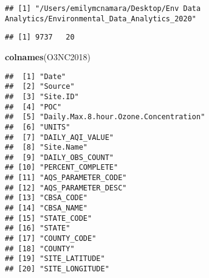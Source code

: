 \documentclass[]{article}
\newenvironment{Shaded}{\begin{snugshade}}{\end{snugshade}}
\newcommand{\KeywordTok}[1]{\textcolor[rgb]{0.13,0.29,0.53}{\textbf{#1}}}
\newcommand{\StringTok}[1]{\textcolor[rgb]{0.31,0.60,0.02}{#1}}
\newcommand{\CommentTok}[1]{\textcolor[rgb]{0.56,0.35,0.01}{\textit{#1}}}
\newcommand{\NormalTok}[1]{#1}
\begin{document}
\begin{Shaded}
\end{Shaded}

\begin{verbatim}
## [1] "/Users/emilymcnamara/Desktop/Env Data Analytics/Environmental_Data_Analytics_2020"
\end{verbatim}

\begin{Shaded}
\end{Shaded}

\begin{verbatim}
## [1] 9737   20
\end{verbatim}

\begin{Shaded}
\begin{Highlighting}[]
\KeywordTok{colnames}\NormalTok{(O3NC2018)}
\end{Highlighting}
\end{Shaded}

\begin{verbatim}
##  [1] "Date"                                
##  [2] "Source"                              
##  [3] "Site.ID"                             
##  [4] "POC"                                 
##  [5] "Daily.Max.8.hour.Ozone.Concentration"
##  [6] "UNITS"                               
##  [7] "DAILY_AQI_VALUE"                     
##  [8] "Site.Name"                           
##  [9] "DAILY_OBS_COUNT"                     
## [10] "PERCENT_COMPLETE"                    
## [11] "AQS_PARAMETER_CODE"                  
## [12] "AQS_PARAMETER_DESC"                  
## [13] "CBSA_CODE"                           
## [14] "CBSA_NAME"                           
## [15] "STATE_CODE"                          
## [16] "STATE"                               
## [17] "COUNTY_CODE"                         
## [18] "COUNTY"                              
## [19] "SITE_LATITUDE"                       
## [20] "SITE_LONGITUDE"
\end{verbatim}
\end{document}

